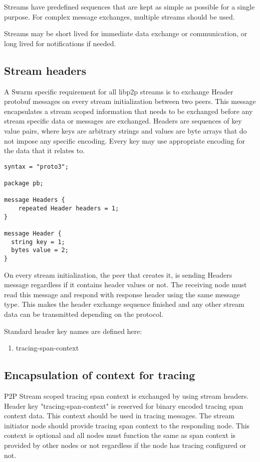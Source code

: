 Streams have predefined sequences that are kept as simple as possible for a single purpose. For complex message exchanges, multiple streams should be used.

Streams may be short lived for immediate data exchange or communication, or long lived for notifications if needed.

\subsection{Stream headers}

A Swarm specific requirement for all libp2p streams is to exchange Header protobuf messages on every stream initialization between two peers. This message encapsulates a stream scoped information that needs to be exchanged before any stream specific data or messages are exchanged. Headers are sequences of key value pairs, where keys are arbitrary strings and values are byte arrays that do not impose any specific encoding. Every key may use appropriate encoding for the data that it relates to.

\begin{definition}\label{def:headers-message}

\begin{lstlisting}[language=protobuf3]
syntax = "proto3";

package pb;

message Headers {
    repeated Header headers = 1;
}

message Header {
  string key = 1;
  bytes value = 2;
}
\end{lstlisting}
\end{definition}

On every stream initialization, the peer that creates it, is sending Headers message regardless if it contains header values or not. The receiving node must read this message and respond with response header using the same message type. This makes the header exchange sequence finished and any other stream data can be transmitted depending on the protocol.

Standard header key names are defined here:

\begin{enumerate}
\item tracing-span-context
\end{enumerate}


\subsection{Encapsulation of context for tracing \statusgreen}

P2P Stream scoped tracing span context is exchanged by using stream headers. Header key "tracing-span-context" is reserved for binary encoded tracing span context data. This context should be used in tracing messages. The stream initiator node should provide tracing span context to the responding node. This context is optional and all nodes must function the same as span context is provided by other nodes or not regardless if the node has tracing configured or not.
